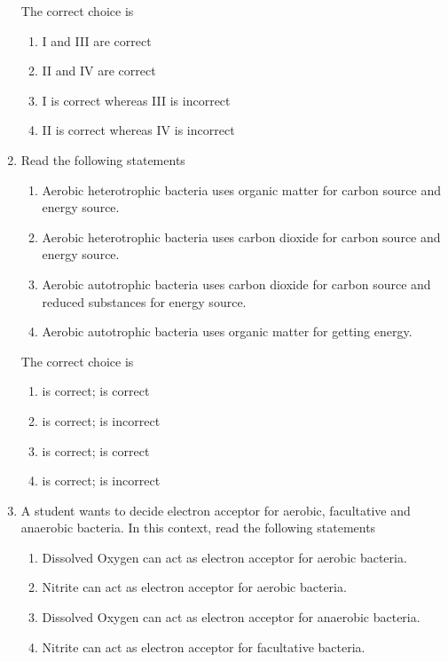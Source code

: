 \documentclass[journal,12pt,onecolumn]{IEEEtran}
\theoremstyle{remark}
\begin{document}
\begin{enumerate}[start=1, label={Q\arabic*.}]
The correct choice is

\begin{enumerate}[label=(\Alph*)]
\item I and III are correct
\item II and IV are correct
\item I is correct whereas III is incorrect
\item II is correct whereas IV is incorrect
\end{enumerate}
\hfill{}
\item Read the following statements

\begin{enumerate}[label=\roman*.]
\item Aerobic heterotrophic bacteria uses organic matter for carbon source and energy source.
\item Aerobic heterotrophic bacteria uses carbon dioxide for carbon source and energy source.
\item Aerobic autotrophic bacteria uses carbon dioxide for carbon source and reduced substances for energy source.
\item Aerobic autotrophic bacteria uses organic matter for getting energy.
\end{enumerate}

The correct choice is

\begin{enumerate}[label=(\Alph*)]
\item {} is correct;  is correct
\item {} is correct;  is incorrect
\item {} is correct;  is correct
\item {} is correct;  is incorrect
\end{enumerate}
\hfill{}

\item A student wants to decide electron acceptor for aerobic, facultative and anaerobic bacteria. In this context, read the following statements

\begin{enumerate}[label=\roman*.]
\item Dissolved Oxygen  can act as electron acceptor for aerobic bacteria.
\item Nitrite can act as electron acceptor for aerobic bacteria.
\item Dissolved Oxygen  can act as electron acceptor for anaerobic bacteria.
\item Nitrite can act as electron acceptor for facultative bacteria.
\end{enumerate}


\end{enumerate}
\end{document}
